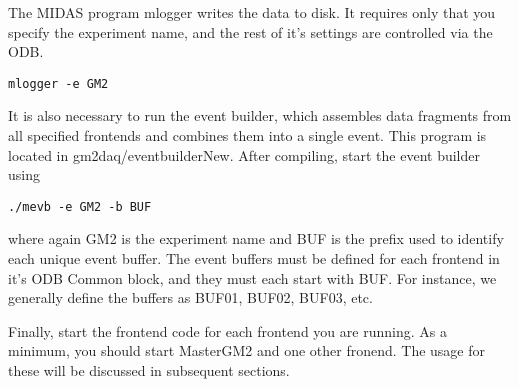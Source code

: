 The MIDAS program mlogger writes the data to disk. It requires only that you specify the experiment name, and the rest of it's settings are controlled via the ODB.

\begin{verbatim}
mlogger -e GM2
\end{verbatim}

It is also necessary to run the event builder, which assembles data fragments from all specified frontends and combines them into a single event. This program is located in gm2daq/eventbuilderNew. After compiling, start the event builder using

\begin{verbatim}
./mevb -e GM2 -b BUF
\end{verbatim}

where again GM2 is the experiment name and BUF is the prefix used to identify each unique event buffer. The event buffers must be defined for each frontend in it's ODB Common block, and they must each start with BUF. For instance, we generally define the buffers as BUF01, BUF02, BUF03, etc.

Finally, start the frontend code for each frontend you are running. As a minimum, you should start MasterGM2 and one other fronend. The usage for these will be discussed in subsequent sections.

